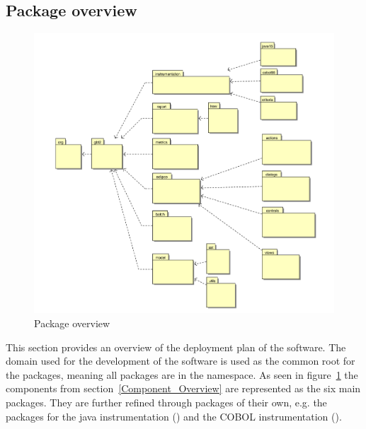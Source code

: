 \clearpage
\subsection{Package overview}

\begin{figure}[hbtp]
 \centering
 \includegraphics[width=\textwidth]{images/Overview/package_overview.pdf}
 \caption{Package overview}
 \label{figure:Overview:package_overview}
\end{figure}

This section provides an overview of the deployment plan of the software. The domain used for the development of the software is used as the common root for the packages, meaning all packages are in the \pkg{\rootpkg} namespace.  As seen in figure~\ref{figure:Overview:package_overview} the components from section~\ref{Component_Overview} are represented as the six main packages. They are further refined through packages of their own, e.g. the packages for the java instrumentation () and the COBOL instrumentation ().
